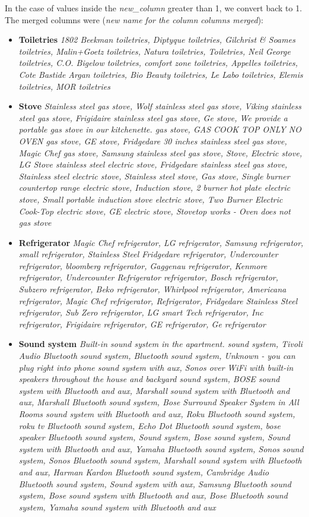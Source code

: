 In the case of values inside the \textit{new\_column} greater than 1, we convert back to 1.
The merged columns were (\textit{new name for the column} \textrightarrow \textit{columns merged}):
\begin{itemize}
	\item \textbf{Toiletries} \textrightarrow \textit{1802 Beekman toiletries, Diptyque toiletries, Gilchrist \& Soames toiletries, Malin+Goetz toiletries, Natura toiletries, Toiletries, Neil George toiletries, C.O. Bigelow toiletries,  comfort zone  toiletries, Appelles toiletries, Cote Bastide Argan toiletries, Bio Beauty toiletries, Le Labo toiletries, Elemis toiletries, MOR toiletries}
	\item \textbf{Stove} \textrightarrow \textit{Stainless steel gas stove, Wolf stainless steel gas stove, Viking stainless steel gas stove, Frigidaire stainless steel gas stove, Ge stove, We provide a portable gas stove in our kitchenette.  gas stove, GAS COOK TOP ONLY NO OVEN gas stove, GE stove, Fridgedare 30 inches stainless steel gas stove, Magic Chef  gas stove, Samsung stainless steel gas stove, Stove, Electric stove, LG Stove stainless steel electric stove, Fridgedare stainless steel gas stove, Stainless steel electric stove, Stainless steel stove, Gas stove, Single burner countertop range electric stove, Induction stove, 2 burner hot plate electric stove, Small portable induction stove  electric stove, Two Burner Electric Cook-Top electric stove, GE  electric stove, Stovetop works - Oven does not gas stove}
	\item \textbf{Refrigerator} \textrightarrow \textit{Magic Chef refrigerator, LG refrigerator, Samsung refrigerator, small  refrigerator, Stainless Steel Fridgedare refrigerator, Undercounter refrigerator, bloomberg refrigerator, Gaggenau refrigerator, Kenmore refrigerator, Undercounter Refrigerator refrigerator, Bosch refrigerator, Subzero refrigerator, Beko refrigerator, Whirlpool refrigerator, Americana refrigerator, Magic Chef  refrigerator, Refrigerator, Fridgedare Stainless Steel refrigerator, Sub Zero refrigerator, LG smart Tech refrigerator, Inc refrigerator, Frigidaire refrigerator, GE refrigerator, Ge refrigerator}
	\item \textbf{Sound system} \textrightarrow \textit{Built-in sound system in the apartment. sound system, Tivoli Audio Bluetooth sound system, Bluetooth sound system, Unknown - you can plug right into phone sound system with aux, Sonos over WiFi with built-in speakers throughout the house and backyard sound system, BOSE sound system with Bluetooth and aux, Marshall  sound system with Bluetooth and aux, Marshall  Bluetooth sound system, Bose Surround Speaker System in All Rooms sound system with Bluetooth and aux, Roku Bluetooth sound system, roku tv Bluetooth sound system, Echo Dot Bluetooth sound system, bose speaker Bluetooth sound system, Sound system, Bose sound system, Sound system with Bluetooth and aux, Yamaha Bluetooth sound system, Sonos sound system, Sonos Bluetooth sound system, Marshall sound system with Bluetooth and aux, Harman Kardon Bluetooth sound system, Cambridge Audio Bluetooth sound system, Sound system with aux, Samsung Bluetooth sound system, Bose sound system with Bluetooth and aux, Bose Bluetooth sound system, Yamaha sound system with Bluetooth and aux}

\end{itemize}
